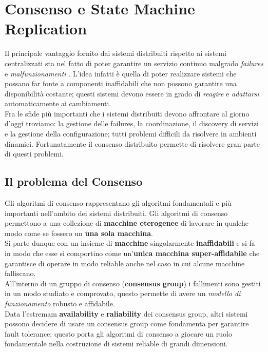 \chapter{Consenso e State Machine Replication}
Il principale vantaggio fornito dai sistemi distribuiti rispetto ai sistemi centralizzati sta nel fatto di poter garantire un servizio continuo malgrado \textit{failures} e \textit{malfunzionamenti} \cite[Friedman:1996]{Friedman:1996}.
L'idea infatti è quella di poter realizzare sistemi che possano far fonte a componenti inaffidabili che non possono garantire una disponibilità costante; questi sistemi devono essere in grado di \textit{reagire} e \textit{adattarsi} automaticamente ai cambiamenti.\\
Fra le sfide più importanti che i sistemi distribuiti devono affrontare al giorno d'oggi troviamo: la gestione delle failures, la coordinazione, il discovery di servizi e la gestione della configurazione; tutti problemi difficili da risolvere in ambienti dinamici. Fortunatamente il consenso distribuito permette di risolvere gran parte di questi problemi.
	
	\section{Il problema del Consenso}
	Gli algoritmi di consenso rappresentano gli algoritmi fondamentali e più importanti nell'ambito dei sistemi distribuiti.
	Gli algoritmi di consenso permettono a una collezione di \textbf{macchine eterogenee} di lavorare in qualche modo come se fossero un \textbf{una sola macchina}.\\
	Si parte dunque con un insieme di \textbf{macchine} singolarmente \textbf{inaffidabili} e si fa in modo che esse si comportino come un'\textbf{unica macchina super-affidabile} che garantisce di operare in modo reliable anche nel caso in cui alcune macchine falliscano.\\
	All'interno di un gruppo di consenso (\textbf{consensus group}) i fallimenti sono gestiti in un modo studiato e comprovato, questo permette di avere un \textit{modello di funzionamento} robusto e affidabile.\\
	Data l'estremam \textbf{availability} e \textbf{raliability} dei consensus group, altri sistemi possono decidere di usare un consensus group come fondamenta per garantire fault tolerance; questo porta gli algoritmi di consenso a giocare un ruolo fondamentale nella costruzione di sistemi reliable di grandi dimensioni.
